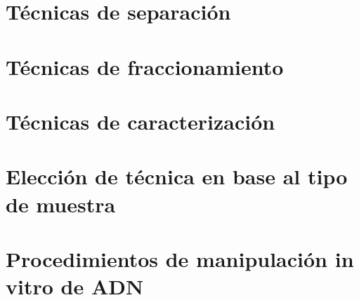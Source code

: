 


\section{Técnicas de separación}



\section{Técnicas de fraccionamiento}



\section{Técnicas de caracterización}



\section{Elección de técnica en base al tipo de muestra}



\section{Procedimientos de manipulación in vitro de ADN}





\putbib